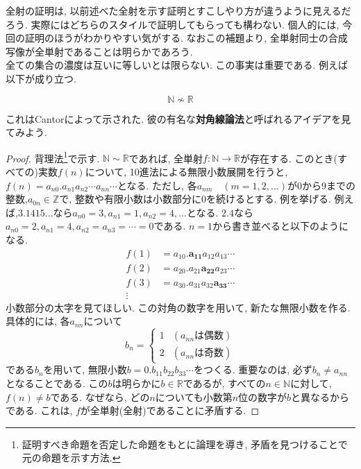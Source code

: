 \documentclass[a4j,dvipdfmx]{jsarticle}
\numberwithin{equation}{section}
\begin{document}
                全射の証明は, 以前述べた全射を示す証明とすこしやり方が違うように見えるだろう. 実際にはどちらのスタイルで証明してもらっても構わない. 個人的には, 今回の証明のほうがわかりやすい気がする.
                なおこの補題より, 全単射同士の合成写像が全単射であることは明らかであろう.\\

                全ての集合の濃度は互いに等しいとは限らない. この事実は重要である. 例えば以下が成り立つ.
                \begin{screen}
                    \[\mathbb{N}\nsim \mathbb{R}\]
                \end{screen}
                これはCantorによって示された. 彼の有名な\textbf{対角線論法}と呼ばれるアイデアを見てみよう.
                \begin{proof}
                    背理法\footnote{証明すべき命題を否定した命題をもとに論理を導き, 矛盾を見つけることで元の命題を示す方法.}で示す. $\mathbb{N}\sim\mathbb{R}$であれば, 全単射$f:\mathbb{N}\rightarrow \mathbb{R}$が存在する.
                    このとき(すべての)実数$f(n)$について, 10進法による無限小数展開を行うと, $f(n)=a_{n0}.a_{n1}a_{n2}\cdots a_{nn}\cdots$となる. ただし, 各$a_{nm}\quad(m=1,2,...)$が0から9までの整数,$a_{0n}\in \mathbb{Z}$で, 整数や有限小数は小数部分に0を続けるとする.
                    例を挙げる. 例えば,$3.1415...$なら$a_{n0}=3,a_{n1}=1,a_{n2}=4,...$となる. $2.4$なら$a_{n0}=2,a_{n1}=4,a_{n2}=a_{n3}=\cdots=0$である. $n=1$から書き並べると以下のようになる.
                    \begin{align*}
                        f(1)&=a_{10}.\bm{a_{11}}a_{12}a_{13}\cdots\\
                        f(2)&=a_{20}.a_{21}\bm{a_{22}}a_{23}\cdots\\
                        f(3)&=a_{30}.a_{31}a_{32}\bm{a_{33}}\cdots\\
                        \vdots
                    \end{align*}
                    小数部分の太字を見てほしい. この対角の数字を用いて, 新たな無限小数を作る. 具体的には, 各$a_{nn}$について
                    \begin{equation*}
                        b_n=\left\{\begin{array}{lc}
                            1 & (a_{nn}は偶数)\\
                            2 & (a_{nn}は奇数)
                        \end{array}\right.
                    \end{equation*}
                    である$b_n$を用いて, 無限小数$b=0.b_{11}b_{22}b_{33}\cdots$をつくる. 重要なのは, 必ず$b_{n}\neq a_{nn}$となることである. この$b$は明らかに$b\in{\mathbb{R}}$であるが, 
                    すべての$n\in \mathbb{N}$に対して, $f(n)\neq b$である. なぜなら, どの$n$についても小数第$n$位の数字が$b$と異なるからである.
                    これは, $f$が全単射(全射)であることに矛盾する.
                \end{proof}
\end{document}
